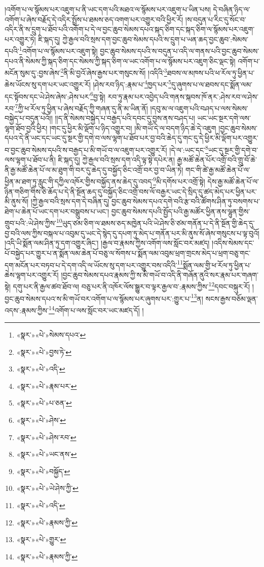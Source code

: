 །འགོག་པ་ལ་སྙོམས་པར་འཇུག་པ་ནི་ཡང་དག་པའི་མཐའ་ལ་སྙོམས་པར་འཇུག་པ་ཡིན་པས། དེ་བཞིན་ཉིད་ལ་འགོག་པ་ཞེས་བརྗོད་དེ་འདིར་སྤྲོས་པ་ཐམས་ཅད་འགག་པར་འགྱུར་བའི་ཕྱིར་རོ། །ས་བདུན་པ་རིང་དུ་སོང་བ་འདིར་ནི་ས་དྲུག་པ་ཐོབ་པའི་འགོག་པ་དེ་ལ་བྱང་ཆུབ་སེམས་དཔའ་སྐད་ཅིག་དང་སྐད་ཅིག་ལ་སྙོམས་པར་འཇུག་པར་འགྱུར་ཏེ། ཇི་སྐད་དུ། ཀྱེ་རྒྱལ་བའི་སྲས་དག་བྱང་ཆུབ་སེམས་དཔའི་ས་དྲུག་པ་ཡན་ཆད་བྱང་ཆུབ་:སེམས་དཔའི་\footnote{«སྣར་»«པེ་»སེམས་དཔའ་}འགོག་པ་ལ་སྙོམས་པར་འཇུག་སྟེ། བྱང་ཆུབ་སེམས་དཔའི་ས་བདུན་པ་འདི་ལ་གནས་པའི་བྱང་ཆུབ་སེམས་དཔའ་ནི་སེམས་ཀྱི་སྐད་ཅིག་དང་སེམས་ཀྱི་སྐད་ཅིག་ལ་ཡང་འགོག་པ་ལ་སྙོམས་པར་འཇུག་ཅིང་ལྡང་སྟེ། འགོག་པ་མངོན་སུམ་དུ་:བྱས་ཞེས་\footnote{«སྣར་»«པེ་»བྱས་ཏེ་}ནི་མི་བྱའོ་ཞེས་རྒྱས་པར་གསུངས་སོ། །འདིའི་\footnote{«སྣར་»«པེ་»འདི་}ཐབས་ལ་མཁས་པའི་ཕ་རོལ་ཏུ་ཕྱིན་པ་ཆེས་ཡོངས་སུ་དག་པར་ཡང་འགྱུར་རོ། །ཤེས་རབ་ཉིད་:རྣམ་པ་\footnote{«སྣར་»«པེ་»རྣམ་པར་}ཁྱད་པར་\footnote{«སྣར་»«པེ་»པ་ཅན་}དུ་ཞུགས་པ་ལ་ཐབས་དང་སྨོན་ལམ་དང་སྟོབས་དང་ཡེ་ཤེས་ཞེས་:ཤེས་པར་\footnote{«སྣར་»«པེ་»ཤེས་}བྱ་སྟེ། རབ་ཏུ་རྣམ་པར་འབྱེད་པའི་གནས་སྐབས་ཁོ་ནར་:ཤེས་རབ་ལ་ཤེས་རབ་\footnote{«སྣར་»«པེ་»ཤེས་རབ་}ཀྱི་ཕ་རོལ་ཏུ་ཕྱིན་པ་ཞེས་བརྗོད་ཀྱི་གཞན་དུ་ནི་མ་ཡིན་ནོ། །དབུ་མ་ལ་འཇུག་པའི་བཤད་པ་ལས་སེམས་བསྐྱེད་པ་བདུན་པའོ།། །།ད་ནི་སེམས་བསྐྱེད་པ་བརྒྱད་པའི་དབང་དུ་བྱས་ནས་བཤད་པ། ཡང་ཡང་སྔར་དགེ་ལས་ལྷག་ཐོབ་བྱའི་ཕྱིར། །གང་དུ་ཕྱིར་མི་ལྡོག་པ་ཉིད་འགྱུར་བ། །མི་གཡོ་དེ་ལ་བདག་ཉིད་ཆེ་དེ་འཇུག །བྱང་ཆུབ་སེམས་དཔའ་དེ་ནི་ཡང་དང་ཡང་དུ་སྔར་གྱི་དགེ་བ་ལས་ལྷག་པ་ཐོབ་པར་བྱ་བའི་ཆེད་དུ་གང་དུ་དེ་ཕྱིར་མི་ལྡོག་པར་འགྱུར་བ་བྱང་ཆུབ་སེམས་དཔའི་ས་བརྒྱད་པ་མི་གཡོ་བ་ལ་འཇུག་པར་འགྱུར་རོ། །དེ་ལ་:ཡང་དང་\footnote{«སྣར་»«པེ་»ཡང་ནས་}ཡང་དུ་སྔར་གྱི་དགེ་བ་ལས་ལྷག་པ་ཐོབ་པ་ནི། ཇི་སྐད་དུ། ཀྱེ་རྒྱལ་བའི་སྲས་དག་འདི་ལྟ་སྟེ་དཔེར་ན། རྒྱ་མཚོ་ཆེན་པོར་འགྲོ་བའི་གྲུ་བོ་ཆེ་ནི་རྒྱ་མཚོ་ཆེན་པོ་ལ་མ་ཐུག་གི་བར་དུ་ཆེད་དུ་བསྐྱོད་ཅིང་འགྲོ་བར་བྱ་བ་ཡིན་ཏེ། གང་གི་ཚེ་རྒྱ་མཚོ་ཆེན་པོ་ལ་ཕྱིན་མ་ཐག་ཏུ་རླུང་གི་དཀྱིལ་འཁོར་གྱིས་བསྐྱོད་ནས་ཆེད་དུ་འབད་\footnote{«སྣར་»«པེ་»བསྐྱོད་}མི་དགོས་པར་འགྲོ་སྟེ། དེས་རྒྱ་མཚོ་ཆེན་པོ་ལ་ཉིན་གཅིག་གིས་ཅི་ཆོད་པ་དེ་ནི་སྔོན་ཆད་དུ་བསྐྱོད་ཅིང་འགྲོ་བས་ལོ་བརྒྱར་ཡང་དེ་སྲིད་དུ་ཚད་མེད་པར་ཕྱིན་པར་མི་ནུས་སོ། །ཀྱེ་རྒྱལ་བའི་སྲས་དག་དེ་བཞིན་དུ། བྱང་ཆུབ་སེམས་དཔའ་དགེ་བའི་རྩ་བའི་ཚོགས་ཤིན་ཏུ་བསགས་པ་ཐེག་པ་ཆེན་པོ་ཡང་དག་པར་བསྒྲུབས་པ་ཡང་། བྱང་ཆུབ་སེམས་དཔའི་སྤྱོད་པའི་རྒྱ་མཚོར་ཕྱིན་ནས་ལྷུན་གྱིས་གྲུབ་པའི་:ཡེ་ཤེས་ཀྱིས་\footnote{«སྣར་»«པེ་»ཡེ་ཤེས་ཀྱི་}ཡུད་ཙམ་ཅིག་ལ་ཐམས་ཅད་མཁྱེན་པའི་ཡེ་ཤེས་ཅི་ཙམ་གནོན་པ་དེ་ནི་སྔོན་གྱི་ཆེད་དུ་བྱ་བའི་ལས་ཀྱིས་བསྐལ་པ་འབུམ་དུ་ཡང་དེ་སྙེད་དུ་དཔག་ཏུ་མེད་པ་གནོན་པར་མི་ནུས་སོ་ཞེས་གསུངས་པ་ལྟ་བུའོ། །འདི་ཡི་སྨོན་ལམ་ཤིན་ཏུ་དག་འགྱུར་ཞིང་། །རྒྱལ་བ་རྣམས་ཀྱིས་འགོག་ལས་སློང་བར་མཛད། །འདིས་སེམས་དང་པོ་བསྐྱེད་པར་གྱུར་པ་ན་སྨོན་ལམ་ཆེན་པོ་བཅུ་ལ་སོགས་པ་སྨོན་ལམ་འབུམ་ཕྲག་གྲངས་མེད་པ་ཕྲག་བཅུ་གང་དག་མངོན་པར་བཏབ་པ་དེ་དག་འདི་ལ་ཡོངས་སུ་དག་པར་འགྱུར་བས་འདིའི་\footnote{«སྣར་»«པེ་»འདི་}སྨོན་ལམ་གྱི་ཕ་རོལ་ཏུ་ཕྱིན་པ་ཆེས་ལྷག་པར་འགྱུར་རོ། །བྱང་ཆུབ་སེམས་དཔའ་རྣམས་ཀྱི་ས་མི་གཡོ་བ་འདི་ནི་གཞོན་ནུའི་སར་རྣམ་པར་གཞག་སྟེ། དགུ་པར་ནི་རྒྱལ་ཚབ་ཐོབ་ལ། བཅུ་པར་ནི་འཁོར་ལོས་སྒྱུར་བ་ལྟར་རྒྱལ་བ་:རྣམས་ཀྱིས་\footnote{«སྣར་»«པེ་»རྣམས་ཀྱི་}དབང་བསྐུར་རོ། །བྱང་ཆུབ་སེམས་དཔའ་ས་མི་གཡོ་བར་འགོག་པ་ལ་སྙོམས་པར་ཞུགས་པར་:གྱུར་པ་\footnote{«སྣར་»«པེ་»གྱུར་}ན། སངས་རྒྱས་བཅོམ་ལྡན་འདས་:རྣམས་ཀྱིས་\footnote{«སྣར་»«པེ་»རྣམས་ཀྱི་}འགོག་པ་ལས་སློང་བར་ཡང་མཛད་དོ། །
